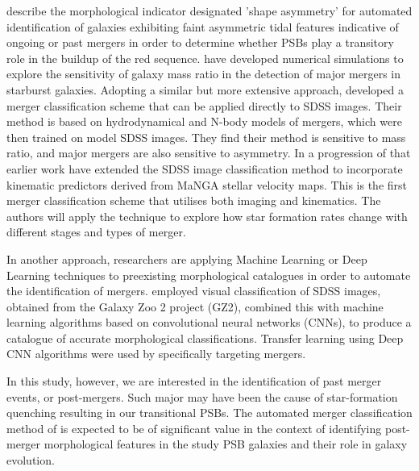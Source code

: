 \cite{2016MNRAS.456.3032P} describe the morphological indicator designated 'shape asymmetry' for automated identification of galaxies exhibiting faint asymmetric tidal features indicative of ongoing or past mergers in order to determine whether PSBs play a transitory role in the buildup of the red sequence. \cite{2011arXiv1102.0550B} have developed numerical simulations to explore the sensitivity of galaxy mass ratio in the detection of major mergers in starburst galaxies. Adopting a similar but more extensive approach, \cite{2019ApJ...872...76N} developed a merger classification scheme that can be applied directly to SDSS images. Their method is based on hydrodynamical and N-body models of mergers, which were then trained on model SDSS images. They find their method is sensitive to mass ratio, and major mergers are also sensitive to asymmetry. In a progression of that earlier work  \cite{2019DDA....5020304N} have extended the SDSS image classification method to incorporate kinematic predictors derived from MaNGA stellar velocity maps. This is the first merger classification scheme that utilises both imaging and kinematics. The authors will apply the technique to explore how star formation rates change with different stages and types of merger. 

In another approach, researchers are applying Machine Learning or Deep Learning techniques to preexisting morphological catalogues in order to automate the identification of mergers. \citet{2018MNRAS.476.3661D} employed visual classification of SDSS images, obtained from the Galaxy Zoo 2 project (GZ2), combined this with machine learning algorithms based on convolutional neural networks (CNNs), to produce a catalogue of accurate morphological classifications. Transfer learning using Deep CNN algorithms were used by \citet{2018MNRAS.479..415A} specifically targeting mergers. 

In this study, however, we are interested in the identification of past merger events, or post-mergers. Such major may have been the cause of star-formation quenching resulting in our transitional PSBs. The automated merger classification method of  \cite{2019DDA....5020304N} is expected to be of significant value in the context of identifying post-merger morphological features in the study PSB galaxies and their role in galaxy evolution. 


